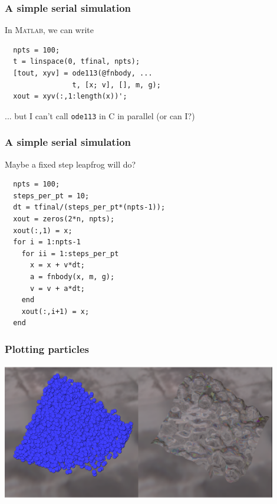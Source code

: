 \documentclass{beamer}
\begin{document}
\begin{frame}[fragile]
  \frametitle{A simple serial simulation}

  In \textsc{Matlab}, we can write
\begin{verbatim}
  npts = 100;
  t = linspace(0, tfinal, npts);
  [tout, xyv] = ode113(@fnbody, ...
                t, [x; v], [], m, g);
  xout = xyv(:,1:length(x))';
\end{verbatim}
  ... but I can't call {\tt ode113} in C in parallel (or can I?)

\end{frame}


\begin{frame}[fragile]
  \frametitle{A simple serial simulation}

  Maybe a fixed step leapfrog will do?
\begin{verbatim}
  npts = 100;
  steps_per_pt = 10;
  dt = tfinal/(steps_per_pt*(npts-1));
  xout = zeros(2*n, npts);
  xout(:,1) = x;
  for i = 1:npts-1
    for ii = 1:steps_per_pt
      x = x + v*dt;
      a = fnbody(x, m, g);
      v = v + a*dt;
    end
    xout(:,i+1) = x;
  end
\end{verbatim}

\end{frame}


\begin{frame}
  \frametitle{Plotting particles}

  \begin{center}
    \includegraphics[width=0.9\textwidth]{figs/sph-plot.png}
  \end{center}
\end{frame}
\end{document}
